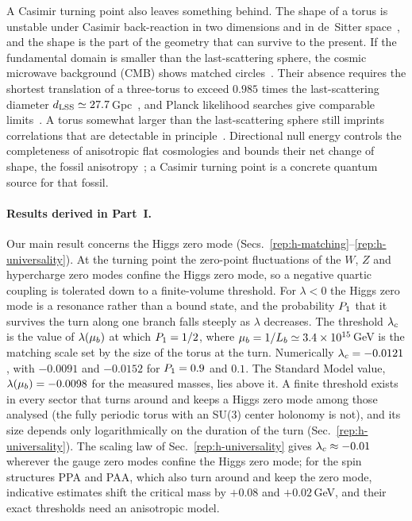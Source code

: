 A Casimir turning point also leaves something behind.
The shape of a torus is unstable under Casimir back-reaction in two dimensions and in de~Sitter space~\cite{Seriu:1995hc,Ponton:2001hq,COMPACT:2026vdj}, and the shape is the part of the geometry that can survive to the present.
If the fundamental domain is smaller than the last-scattering sphere, the cosmic microwave background (CMB) shows matched circles~\cite{Cornish:1997ab}.
Their absence requires the shortest translation of a three-torus to exceed $0.985$ times the last-scattering diameter $d_{\mathrm{LSS}}\simeq27.7$\,Gpc~\cite{Vaudrevange:2012da,COMPACT:2022nsu}, and Planck likelihood searches give comparable limits~\cite{Planck:2015gmu,COMPACT:2026uzi}. %
A torus somewhat larger than the last-scattering sphere still imprints correlations that are detectable in principle~\cite{COMPACT:2023rkp,Himeno:2026lgh}.
Directional null energy controls the completeness of anisotropic flat cosmologies and bounds their net change of shape, the fossil anisotropy~\cite{Zhou:2026szo}; a Casimir turning point is a concrete quantum source for that fossil.

\paragraph{Results derived in Part~I.}
Our main result concerns the Higgs zero mode (Secs.~\ref{rep:h-matching}--\ref{rep:h-universality}).
At the turning point the zero-point fluctuations of the $W$, $Z$ and hypercharge zero modes confine the Higgs zero mode, so a negative quartic coupling is tolerated down to a finite-volume threshold.
For $\lambda<0$ the Higgs zero mode is a resonance rather than a bound state, and the probability $P_1$ that it survives the turn along one branch falls steeply as $\lambda$ decreases.
The threshold $\lambda_c$ is the value of $\lambda(\mu_b)$ at which $P_1=1/2$, where $\mu_b=1/L_b\simeq3.4\times10^{15}$\,GeV is the matching scale set by the size of the torus at the turn. %
Numerically $\lambda_c=-0.0121$, with $-0.0091$ and $-0.0152$ for $P_1=0.9$ and $0.1$. %
The Standard Model value, $\lambda(\mu_b)=-0.0098$ for the measured masses, lies above it. %
A finite threshold exists in every sector that turns around and keeps a Higgs zero mode among those analysed (the fully periodic torus with an SU(3) center holonomy is not), and its size depends only logarithmically on the duration of the turn (Sec.~\ref{rep:h-universality}).
The scaling law of Sec.~\ref{rep:h-universality} gives $\lambda_c\approx-0.01$ wherever the gauge zero modes confine the Higgs zero mode; for the spin structures PPA and PAA, which also turn around and keep the zero mode, indicative estimates shift the critical mass by $+0.08$ and $+0.02$\,GeV, and their exact thresholds need an anisotropic model. %

